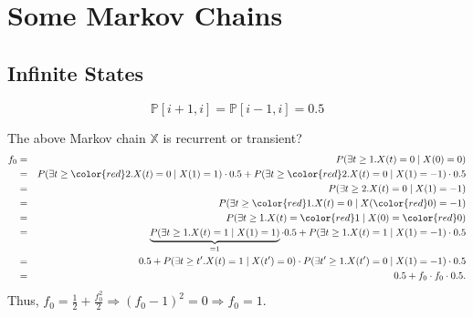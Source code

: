 \section{Some Markov Chains}

\subsection{Infinite States}

\begin{figure}[htp]
\centering
{}
\[ \mathbb{P}[i + 1, i] = \mathbb{P}[i - 1, i] = 0.5 \]
\end{figure}

\begin{question}
The above Markov chain $ \mathbb{X} $ is recurrent or transient?
\begin{eqnarray*}
f_{0}
  & = & P(\exists t \ge 1 . X(t) = 0 \mid X(0) = 0) \\
  & = & P(\exists t \ge {\color{red} 2} . X(t) = 0 \mid X(1) = 1) \cdot 0.5
        + P(\exists t \ge {\color{red} 2} . X(t) = 0 \mid X(1) = -1) \cdot 0.5 \\
  & = & P(\exists t \ge 2 . X(t) = 0 \mid X(1) = -1) \\
  & = & P(\exists t \ge {\color{red} 1} . X(t) = 0 \mid X({\color{red} 0}) = -1) \\
  & = & P(\exists t \ge 1 . X(t) = {\color{red} 1} \mid X(0) = {\color{red} 0}) \\
  & = & \underbrace{P(\exists t \ge 1 . X(t) = 1 \mid X(1) = 1)}_{= 1} \cdot 0.5
        + P(\exists t \ge 1 . X(t) = 1 \mid X(1) = -1) \cdot 0.5 \\
  & = & 0.5 + P(\exists t \ge t' . X(t) = 1 \mid X(t') = 0) \cdot P(\exists t' \ge 1 . X(t') = 0 \mid X(1) = -1) \cdot 0.5 \\
  & = & 0.5 + f_{0} \cdot f_{0} \cdot 0.5.
\end{eqnarray*}
Thus, $ f_{0} = \frac{1}{2} + \frac{f_{0}^{2}}{2} \Rightarrow (f_{0} - 1)^{2} = 0 \Rightarrow f_{0} = 1 $.
\end{question}

